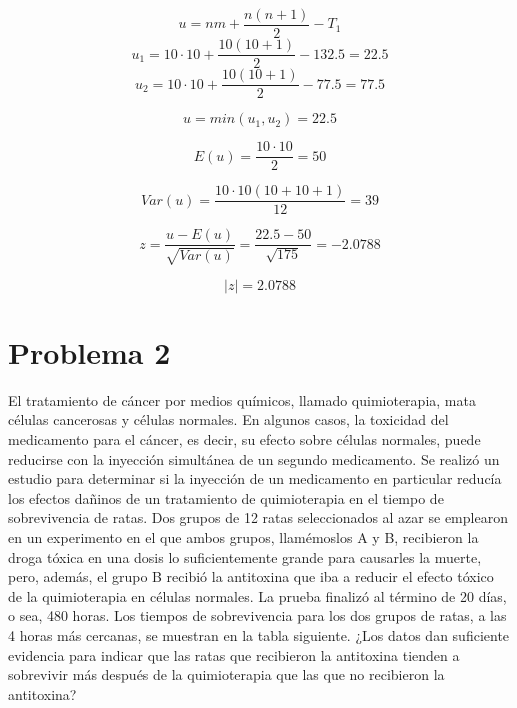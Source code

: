 \documentclass{article}
\begin{document}
\[u = nm + \frac{n(n+1)}{2} - T_1\]
\[u_1 = 10 \cdot 10 + \frac{10(10+1)}{2} - 132.5 = 22.5\]
\[u_2 = 10 \cdot 10 + \frac{10(10+1)}{2} - 77.5 = 77.5\]

\[u = min(u_1, u_2) = 22.5\]

\[E(u) = \frac{10 \cdot 10}{2} = 50\]

\[Var(u) = \frac{10 \cdot 10(10+10+1)}{12} = 39\]

\[z = \frac{u - E(u)}{\sqrt{Var(u)}} = \frac{22.5 - 50}{\sqrt{175}} = -2.0788\]

\[|z| = 2.0788\]



\section{Problema 2}

El tratamiento de cáncer por medios químicos, llamado quimioterapia, mata células cancerosas y células normales. En algunos casos, la toxicidad del medicamento para el cáncer, es decir, su efecto sobre células normales, puede reducirse con la inyección simultánea de un segundo medicamento. Se realizó un estudio para determinar si la inyección de un medicamento en particular reducía los efectos dañinos de un tratamiento de quimioterapia en el tiempo de sobrevivencia de ratas. Dos grupos de 12 ratas seleccionados al azar se emplearon en un experimento en el que ambos grupos, llamémoslos A y B, recibieron la droga tóxica en una dosis lo suficientemente grande para causarles la muerte, pero, además, el grupo B recibió la antitoxina que iba a reducir el efecto tóxico de la quimioterapia en células normales. La prueba finalizó al término de 20 días, o sea, 480 horas. Los tiempos de sobrevivencia para los dos grupos de ratas, a las 4 horas más cercanas, se muestran en la tabla siguiente. ¿Los datos dan suficiente evidencia para indicar que las ratas que recibieron la antitoxina tienden a sobrevivir más después de la quimioterapia que las que no recibieron la antitoxina?
\end{document}
